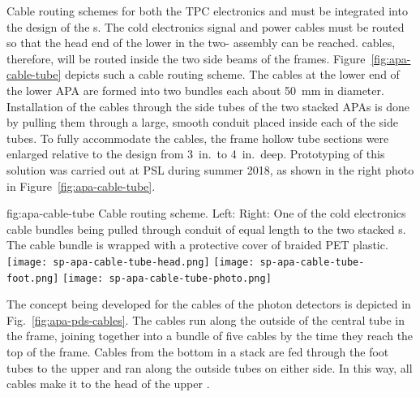 Cable routing schemes for both the TPC electronics and  must be integrated into the design of the s.   The cold electronics signal and power cables must be routed so that the head end of the lower  in the two- assembly can be reached.  cables, therefore, will be routed inside the two side beams of the  frames. Figure~\ref{fig:apa-cable-tube} depicts such a cable routing scheme.  The  cables at the lower end of the lower APA are formed into two bundles each about \SI{50}{mm} in diameter. Installation of the cables through the side tubes of the two stacked APAs is done by pulling them through a large, smooth conduit placed inside each of the side tubes.  To fully accommodate the cables, the  frame hollow tube sections were enlarged relative to the  design from \SI{3}{in}.\ to \SI{4}{in}.\ deep. Prototyping of this solution was carried out at PSL during summer 2018, as shown in the right photo in Figure~\ref{fig:apa-cable-tube}.     


\begin{dunefigure}{fig:apa-cable-tube}
{Cable routing scheme. Left: Right: One of the cold electronics cable bundles being pulled through conduit of equal length to the two stacked s.  The cable bundle is wrapped with a protective cover of braided PET plastic.  }
\texttt{[image: sp-apa-cable-tube-head.png]} \quad
\texttt{[image: sp-apa-cable-tube-foot.png]} \quad
\texttt{[image: sp-apa-cable-tube-photo.png]}
\end{dunefigure}

The concept being developed for the cables of the photon detectors is depicted in Fig.~\ref{fig:apa-pds-cables}.  The cables run along the outside of the central tube in the  frame, joining together into a bundle of five cables by the time they reach the top of the frame.  Cables from the bottom  in a stack are fed through the foot tubes to the upper  and ran along the outside tubes on either side.  In this way, all  cables make it to the head of the upper .  

